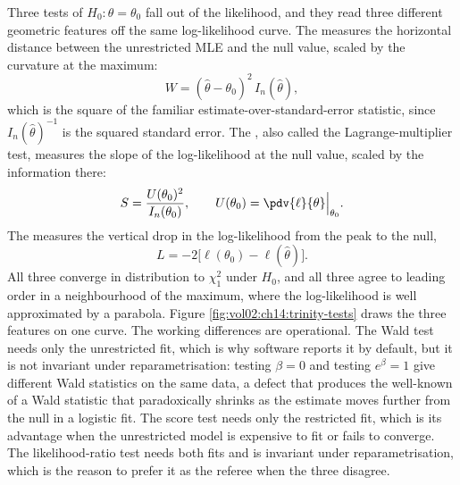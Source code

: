 Three tests of $H_{0}: \theta = \theta_{0}$ fall out of the
likelihood, and they read three different geometric features off the
same log-likelihood curve. The  measures the
horizontal distance between the unrestricted MLE and the null value,
scaled by the curvature at the maximum:
\[
W = (\hat{\theta} - \theta_{0})^{2}\, I_{n}(\hat{\theta}),
\]
which is the square of the familiar estimate-over-standard-error
statistic, since $I_{n}(\hat{\theta})^{-1}$ is the squared standard
error. The , also called the Lagrange-multiplier
test, measures the slope of the log-likelihood at the null value,
scaled by the information there:
\[
S = \frac{U(\theta_{0})^{2}}{I_{n}(\theta_{0})},
\qquad U(\theta_{0}) = \pdv{\ell}{\theta}\Big|_{\theta_{0}}.
\]
The  measures the vertical drop in the
log-likelihood from the peak to the null,
\[
L = -2\bigl[\ell(\theta_{0}) - \ell(\hat{\theta})\bigr].
\]
All three converge in distribution to $\chi^{2}_{1}$ under $H_{0}$,
and all three agree to leading order in a neighbourhood of the
maximum, where the log-likelihood is well approximated by a
parabola. Figure \ref{fig:vol02:ch14:trinity-tests} draws the three
features on one curve. The working differences are operational. The
Wald test needs only the unrestricted fit, which is why software
reports it by default, but it is not invariant under
reparametrisation: testing $\beta = 0$ and testing $e^{\beta} = 1$
give different Wald statistics on the same data, a defect that
produces the well-known  of a Wald
statistic that paradoxically shrinks as the estimate moves further
from the null in a logistic fit. The score test needs only the
restricted fit, which is its advantage when the unrestricted model is
expensive to fit or fails to converge. The likelihood-ratio test
needs both fits and is invariant under reparametrisation, which is
the reason to prefer it as the referee when the three disagree.



